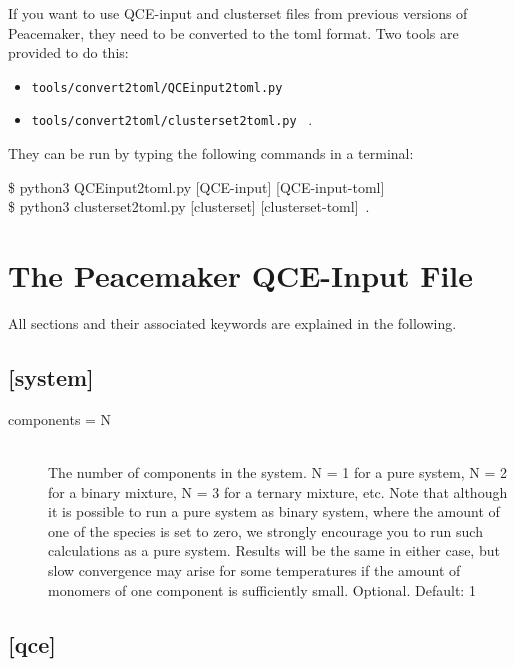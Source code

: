 \documentclass{scrartcl}
\begin{document}
If you want to use QCE-input and clusterset files from previous versions of Peacemaker, they need
to be converted to the toml format.
Two tools are provided to do this:
\begin{itemize}[noitemsep]
    \item \texttt{tools/convert2toml/QCEinput2toml.py} 
    \item \texttt{tools/convert2toml/clusterset2toml.py} ~.
\end{itemize}
They can be run by typing the following commands in a terminal:
\begin{addmargin}[1cm]{0cm}
    \ttfamily
    \$ python3 QCEinput2toml.py [QCE-input] [QCE-input-toml] \\
    \$ python3 clusterset2toml.py [clusterset] [clusterset-toml]~.
\end{addmargin}

\section{The Peacemaker QCE-Input File}
\label{sec:input}

All sections and their associated keywords are explained in the following.

\subsection*{[system]}
\vspace{-0.3cm}

\begin{description}
    \item[components = N] \hfill \\
        The number of components in the system.
        N = 1 for a pure system, N = 2 for a binary mixture, N = 3 for a ternary mixture, etc.
        Note that although it is possible to run a pure system as binary system, where the amount of 
        one of the species is set to zero, we strongly encourage you to run such calculations as a pure system.
        Results will be the same in either case, but slow convergence may arise for some temperatures 
        if the amount of monomers of one component is sufficiently small.
        Optional. Default: 1
\end{description}

\subsection*{[qce]}
\vspace{-0.3cm}
\end{document}
